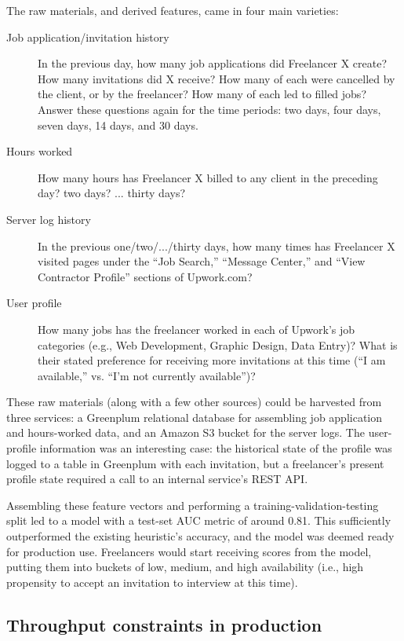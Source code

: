 \documentclass{article}
\begin{document}
The raw materials, and derived features, came in four main varieties:

\begin{description}
\item[Job application/invitation history] In the previous day, how many job applications did Freelancer X create? How many invitations did X receive? How many of each were cancelled by the client, or by the freelancer? How many of each led to filled jobs? Answer these questions again for the time periods: two days, four days, seven days, 14 days, and 30 days.
\item[Hours worked] How many hours has Freelancer X billed to any client in the preceding day? two days? ... thirty days?
\item[Server log history] In the previous one/two/.../thirty days, how many times has Freelancer X visited pages under the ``Job Search,'' ``Message Center,'' and ``View Contractor Profile'' sections of Upwork.com?
\item[User profile] How many jobs has the freelancer worked in each of Upwork's job categories (e.g., Web Development, Graphic Design, Data Entry)? What is their stated preference for receiving more invitations at this time (``I am available,'' vs. ``I'm not currently available'')? 
\end{description}

These raw materials (along with a few other sources) could be harvested from three services: a Greenplum relational database for assembling job application and hours-worked data, and an Amazon S3 bucket for the server logs. The user-profile information was an interesting case: the historical state of the profile was logged to a table in Greenplum with each invitation, but a freelancer's present profile state required a call to an internal service's REST API.

Assembling these feature vectors and performing a training-validation-testing split led to a model with a test-set AUC metric of around 0.81. This sufficiently outperformed the existing heuristic's accuracy, and the model was deemed ready for production use. Freelancers would start receiving scores from the model, putting them into buckets of low, medium, and high availability (i.e., high propensity to accept an invitation to interview at this time).

\subsection{Throughput constraints in production}
\end{document}
